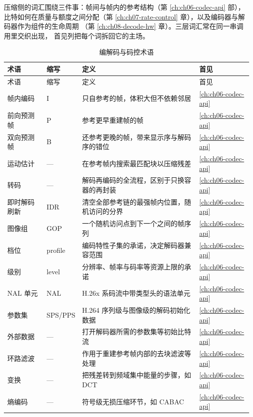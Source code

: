 \documentclass[12pt,a4paper,fontset=fandol]{ctexbook}
\begin{document}
压缩侧的词汇围绕三件事：帧间与帧内的参考结构（第
\ref{ch:ch06-codec-api} 部），比特如何在质量与额度之间分配（第
\ref{ch:ch07-rate-control} 章），以及编码器与解码器作为组件的生命周期
（第 \ref{ch:ch08-decode-hw} 章）。三层词汇常在同一串调用里交织出现，
首见列把每个词拆回它的主场。

\begin{longtable}{>{\raggedright\arraybackslash}p{} >{\raggedright\arraybackslash}p{} >{\raggedright\arraybackslash}p{} >{\raggedright\arraybackslash}p{}}
\caption{编解码与码控术语}\label{tab:apa-codec} \\
\toprule
术语 & 缩写 & 定义 & 首见 \\
\midrule
\endfirsthead
\toprule
术语 & 缩写 & 定义 & 首见 \\
\midrule
\endhead
\bottomrule
\endfoot
帧内编码 & I & 只自参考的帧，体积大但不依赖邻居 & \ref{ch:ch06-codec-api} \\
前向预测帧 & P & 参考更早重建帧的帧 & \ref{ch:ch06-codec-api} \\
双向预测帧 & B & 还参考更晚的帧，带来显示序与解码序的错位 & \ref{ch:ch06-codec-api} \\
运动估计 & — & 在参考帧内搜索最匹配块以压缩残差 & \ref{ch:ch06-codec-api} \\
转码 & — & 解码再编码的全流程，区别于只换容器的再封装 & \ref{ch:ch06-codec-api} \\
即时解码刷新 & IDR & 清空全部参考链的最强帧内位置，随机访问的分界 & \ref{ch:ch06-codec-api} \\
图像组 & GOP & 一个随机访问点到下一个之间的帧序列 & \ref{ch:ch06-codec-api} \\
档位 & profile & 编码特性子集的承诺，决定解码器兼容范围 & \ref{ch:ch06-codec-api} \\
级别 & level & 分辨率、帧率与码率等资源上限的承诺 & \ref{ch:ch06-codec-api} \\
NAL 单元 & NAL & H.26x 系码流中带类型头的语法单元 & \ref{ch:ch06-codec-api} \\
参数集 & SPS/PPS & H.264 序列级与图像级的解码初始化数据 & \ref{ch:ch06-codec-api} \\
外部数据 & — & 打开解码器所需的参数集等初始比特流 & \ref{ch:ch06-codec-api} \\
环路滤波 & — & 作用于重建参考帧内部的去块滤波等处理 & \ref{ch:ch06-codec-api} \\
变换 & — & 把残差转到频域集中能量的步骤，如 DCT & \ref{ch:ch06-codec-api} \\
熵编码 & — & 符号级无损压缩环节，如 CABAC & \ref{ch:ch06-codec-api} \\

\end{longtable}
\end{document}
